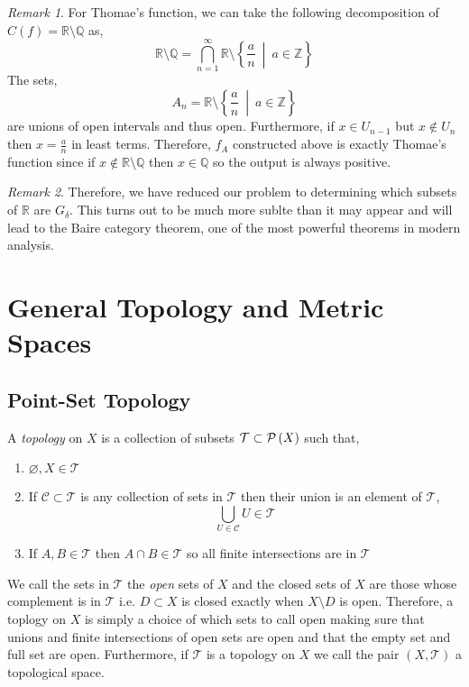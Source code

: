 \documentclass{article}
\newcommand{\Z}{\mathbb{Z}}
\newcommand{\Q}{\mathbb{Q}}
\newcommand{\R}{\mathbb{R}}
\newenvironment{definition}[1][Definition:]{\begin{trivlist}
\item[\hskip \labelsep {\bfseries #1}]}{\end{trivlist}}
\theoremstyle{theorem}
\theoremstyle{definition}
\theoremstyle{definition}
\theoremstyle{remark}
\theoremstyle{definition}
\theoremstyle{remark}
\newtheorem{remark}{Remark}[subsection]
\begin{document}
\begin{remark}
For Thomae's function, we can take the following decomposition of $C(f) = \R \setminus \Q$ as,
\[ \R \setminus \Q = \bigcap_{n = 1}^{\infty} \R \setminus \left\{ \frac{a}{n} \: \middle| \: a \in \Z \right\} \]
The sets,
\[ A_n = \R \setminus \left\{ \frac{a}{n} \: \middle| \: a \in \Z \right\} \]
are unions of open intervals and thus open. Furthermore, if $x \in U_{n-1}$ but $x \notin U_{n}$ then $x = \frac{a}{n}$ in least terms. Therefore, $f_A$ constructed above is exactly Thomae's function since if $x \notin \R \setminus \Q$ then $x \in \Q$ so the output is always positive.
\end{remark}

\begin{remark}
Therefore, we have reduced our problem to determining which subsets of $\R$ are $G_{\delta}$. This turns out to be much more sublte than it may appear and will lead to the Baire category theorem, one of the most powerful theorems in modern analysis. 
\end{remark}

\section{General Topology and Metric Spaces}

\newcommand{\T}{\mathcal{T}}

\subsection{Point-Set Topology}

\begin{definition}
A \textit{topology} on $X$ is a collection of subsets $\T \subset \Power{X}$ such that,
\begin{enumerate}
\item $\varnothing, X \in \T$ 

\item If $\mathcal{C} \subset \T$ is any collection of sets in $\T$ then their union is an element of $\T$,
\[ \bigcup_{U \in \mathcal{C}} U \in \T \]

\item If $A, B \in \T$ then $A \cap B \in \T$ so all finite intersections are in $\T$
\end{enumerate}
We call the sets in $\T$ the \textit{open} sets of $X$ and the closed sets of $X$ are those whose complement is in $\T$ i.e. $D \subset X$ is closed exactly when $X \setminus D$ is open. Therefore, a toplogy on $X$ is simply a choice of which sets to call open making sure that unions and finite intersections of open sets are open and that the empty set and full set are open. Furthermore, if $\T$ is a topology on $X$ we call the pair $(X, \T)$ a topological space. 
\end{definition}
\end{document}
